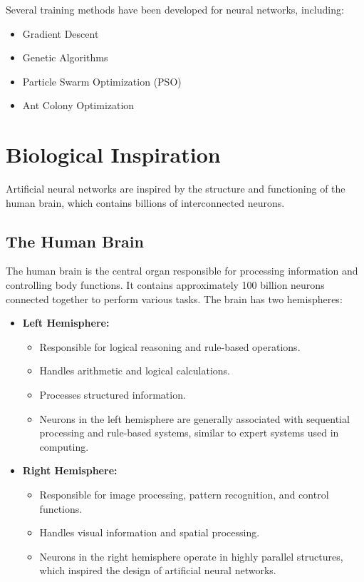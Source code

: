 \documentclass[12pt,a4paper]{article}
\begin{document}
Several training methods have been developed for neural networks, including:

\begin{itemize}
    \item Gradient Descent
    \item Genetic Algorithms
    \item Particle Swarm Optimization (PSO)
    \item Ant Colony Optimization
\end{itemize}

\section{Biological Inspiration}

Artificial neural networks are inspired by the structure and functioning of the human brain, which contains billions of interconnected neurons.

\subsection{The Human Brain}

The human brain is the central organ responsible for processing information and controlling body functions. It contains approximately 100 billion neurons connected together to perform various tasks. The brain has two hemispheres:

\begin{itemize}
    \item \textbf{Left Hemisphere:}
    \begin{itemize}
        \item Responsible for logical reasoning and rule-based operations.
        \item Handles arithmetic and logical calculations.
        \item Processes structured information.
        \item Neurons in the left hemisphere are generally associated with sequential processing and rule-based systems, similar to expert systems used in computing.
    \end{itemize}
    \item \textbf{Right Hemisphere:}
    \begin{itemize}
        \item Responsible for image processing, pattern recognition, and control functions.
        \item Handles visual information and spatial processing.
        \item Neurons in the right hemisphere operate in highly parallel structures, which inspired the design of artificial neural networks.
    \end{itemize}
\end{itemize}
\end{document}
